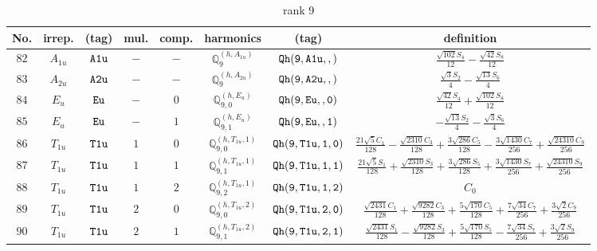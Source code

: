 \documentclass[fleqn,8pt]{jsarticle}
\begin{document}
\begin{table}[ht!]
\begin{center}
\caption{rank 9}
\renewcommand{\arraystretch}{1.3}
\begin{tabular}{cccccccc} \hline \hline
No. & irrep. & (tag) & mul. & comp. & harmonics & (tag) & definition \\ \hline
$ 82 $ & $ A_{1u} $ & $ {\tt A1u} $ & $ - $ & $ - $ & $ \mathbb{Q}_{9}^{(h,A_{1u})} $ & $ {\tt Qh(9,A1u,,)} $ & $ \frac{\sqrt{102} S_{4}}{12} - \frac{\sqrt{42} S_{8}}{12} $ \\
$ 83 $ & $ A_{2u} $ & $ {\tt A2u} $ & $ - $ & $ - $ & $ \mathbb{Q}_{9}^{(h,A_{2u})} $ & $ {\tt Qh(9,A2u,,)} $ & $ \frac{\sqrt{3} S_{2}}{4} - \frac{\sqrt{13} S_{6}}{4} $ \\
$ 84 $ & $ E_{u} $ & $ {\tt Eu} $ & $ - $ & $ 0 $ & $ \mathbb{Q}_{9,0}^{(h,E_{u})} $ & $ {\tt Qh(9,Eu,,0)} $ & $ \frac{\sqrt{42} S_{4}}{12} + \frac{\sqrt{102} S_{8}}{12} $ \\
$ 85 $ & $ E_{u} $ & $ {\tt Eu} $ & $ - $ & $ 1 $ & $ \mathbb{Q}_{9,1}^{(h,E_{u})} $ & $ {\tt Qh(9,Eu,,1)} $ & $ - \frac{\sqrt{13} S_{2}}{4} - \frac{\sqrt{3} S_{6}}{4} $ \\
$ 86 $ & $ T_{1u} $ & $ {\tt T1u} $ & $ 1 $ & $ 0 $ & $ \mathbb{Q}_{9,0}^{(h,T_{1u},1)} $ & $ {\tt Qh(9,T1u,1,0)} $ & $ \frac{21 \sqrt{5} C_{1}}{128} - \frac{\sqrt{2310} C_{3}}{128} + \frac{3 \sqrt{286} C_{5}}{128} - \frac{3 \sqrt{1430} C_{7}}{256} + \frac{\sqrt{24310} C_{9}}{256} $ \\
$ 87 $ & $ T_{1u} $ & $ {\tt T1u} $ & $ 1 $ & $ 1 $ & $ \mathbb{Q}_{9,1}^{(h,T_{1u},1)} $ & $ {\tt Qh(9,T1u,1,1)} $ & $ \frac{21 \sqrt{5} S_{1}}{128} + \frac{\sqrt{2310} S_{3}}{128} + \frac{3 \sqrt{286} S_{5}}{128} + \frac{3 \sqrt{1430} S_{7}}{256} + \frac{\sqrt{24310} S_{9}}{256} $ \\
$ 88 $ & $ T_{1u} $ & $ {\tt T1u} $ & $ 1 $ & $ 2 $ & $ \mathbb{Q}_{9,2}^{(h,T_{1u},1)} $ & $ {\tt Qh(9,T1u,1,2)} $ & $ C_{0} $ \\
$ 89 $ & $ T_{1u} $ & $ {\tt T1u} $ & $ 2 $ & $ 0 $ & $ \mathbb{Q}_{9,0}^{(h,T_{1u},2)} $ & $ {\tt Qh(9,T1u,2,0)} $ & $ \frac{\sqrt{2431} C_{1}}{128} + \frac{\sqrt{9282} C_{3}}{128} + \frac{5 \sqrt{170} C_{5}}{128} + \frac{7 \sqrt{34} C_{7}}{256} + \frac{3 \sqrt{2} C_{9}}{256} $ \\
$ 90 $ & $ T_{1u} $ & $ {\tt T1u} $ & $ 2 $ & $ 1 $ & $ \mathbb{Q}_{9,1}^{(h,T_{1u},2)} $ & $ {\tt Qh(9,T1u,2,1)} $ & $ \frac{\sqrt{2431} S_{1}}{128} - \frac{\sqrt{9282} S_{3}}{128} + \frac{5 \sqrt{170} S_{5}}{128} - \frac{7 \sqrt{34} S_{7}}{256} + \frac{3 \sqrt{2} S_{9}}{256} $ \\

\end{tabular}
\end{center}
\end{table}
\end{document}
